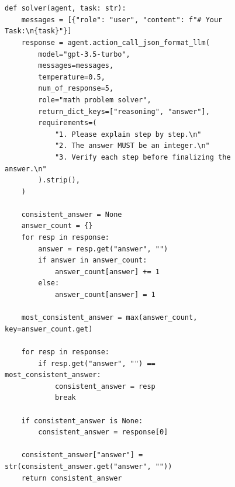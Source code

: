 \begin{figure}[ht]
\begin{lstlisting}[style=pythonstyle, caption={Code of the best policy found by \framework for MGSM.}]


def solver(agent, task: str):
    messages = [{"role": "user", "content": f"# Your Task:\n{task}"}]
    response = agent.action_call_json_format_llm(
        model="gpt-3.5-turbo", 
        messages=messages, 
        temperature=0.5, 
        num_of_response=5,
        role="math problem solver", 
        return_dict_keys=["reasoning", "answer"], 
        requirements=(
            "1. Please explain step by step.\n"
            "2. The answer MUST be an integer.\n"
            "3. Verify each step before finalizing the answer.\n"
        ).strip(),
    )
    
    consistent_answer = None
    answer_count = {}
    for resp in response:
        answer = resp.get("answer", "")
        if answer in answer_count:
            answer_count[answer] += 1
        else:
            answer_count[answer] = 1
    
    most_consistent_answer = max(answer_count, key=answer_count.get)
    
    for resp in response:
        if resp.get("answer", "") == most_consistent_answer:
            consistent_answer = resp
            break
    
    if consistent_answer is None:
        consistent_answer = response[0]
    
    consistent_answer["answer"] = str(consistent_answer.get("answer", ""))
    return consistent_answer
\end{lstlisting}
\end{figure}

